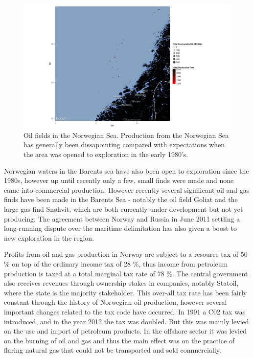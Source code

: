 \documentclass[12pt]{article}
\begin{document}
\begin{figure}
\includegraphics[width=1.2\textwidth]{figures/norwegian_sea_reserves_print.png}
\caption{Oil fields in the Norwegian Sea.  Production from the Norwegian Sea has generally been dissapointing compared with expectations when the area was opened to exploration in the early 1980's.}
\label{norwegian_sea_reserves}
\end{figure}

Norwegian waters in the Barents sea have also been open to exploration since the 1980s, however up until recently only a few, small finds were made and none came into commercial production.  However recently several significant oil and gas finds have been made in the Barents Sea - notably the oil field Goliat and the large gas find Sn\o hvit, which are both currently under development but not yet producing.  The agreement between Norway and Russia in June 2011 settling a long-running dispute over the maritime delimitation has also given a boost to new exploration in the region.  

Profits from oil and gas production in Norway are subject to a resource tax of 50 \% on top of the ordinary income tax of 28 \%, thus income from petroleum production is taxed at a total marginal tax rate of 78 \%.  The central government also receives revenues through ownership stakes in companies, notably Statoil, where the state is the majority stakeholder.  This over-all tax rate has been fairly constant through the history of Norwegian oil production, however several important changes related to the tax code have occurred.  In 1991 a C02 tax was introduced, and in the year 2012 the tax was doubled.  But this was mainly levied on the use and import of petroleum products.  In the offshore sector it was levied on the burning of oil and gas and thus the main effect was on the practice of flaring natural gas that could not be transported and sold commercially.   
\end{document}
